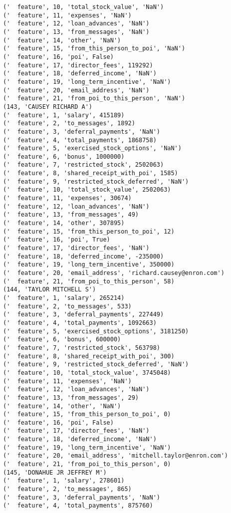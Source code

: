 \begin{verbatim}
('  feature', 10, 'total_stock_value', 'NaN')
('  feature', 11, 'expenses', 'NaN')
('  feature', 12, 'loan_advances', 'NaN')
('  feature', 13, 'from_messages', 'NaN')
('  feature', 14, 'other', 'NaN')
('  feature', 15, 'from_this_person_to_poi', 'NaN')
('  feature', 16, 'poi', False)
('  feature', 17, 'director_fees', 119292)
('  feature', 18, 'deferred_income', 'NaN')
('  feature', 19, 'long_term_incentive', 'NaN')
('  feature', 20, 'email_address', 'NaN')
('  feature', 21, 'from_poi_to_this_person', 'NaN')
(143, 'CAUSEY RICHARD A')
('  feature', 1, 'salary', 415189)
('  feature', 2, 'to_messages', 1892)
('  feature', 3, 'deferral_payments', 'NaN')
('  feature', 4, 'total_payments', 1868758)
('  feature', 5, 'exercised_stock_options', 'NaN')
('  feature', 6, 'bonus', 1000000)
('  feature', 7, 'restricted_stock', 2502063)
('  feature', 8, 'shared_receipt_with_poi', 1585)
('  feature', 9, 'restricted_stock_deferred', 'NaN')
('  feature', 10, 'total_stock_value', 2502063)
('  feature', 11, 'expenses', 30674)
('  feature', 12, 'loan_advances', 'NaN')
('  feature', 13, 'from_messages', 49)
('  feature', 14, 'other', 307895)
('  feature', 15, 'from_this_person_to_poi', 12)
('  feature', 16, 'poi', True)
('  feature', 17, 'director_fees', 'NaN')
('  feature', 18, 'deferred_income', -235000)
('  feature', 19, 'long_term_incentive', 350000)
('  feature', 20, 'email_address', 'richard.causey@enron.com')
('  feature', 21, 'from_poi_to_this_person', 58)
(144, 'TAYLOR MITCHELL S')
('  feature', 1, 'salary', 265214)
('  feature', 2, 'to_messages', 533)
('  feature', 3, 'deferral_payments', 227449)
('  feature', 4, 'total_payments', 1092663)
('  feature', 5, 'exercised_stock_options', 3181250)
('  feature', 6, 'bonus', 600000)
('  feature', 7, 'restricted_stock', 563798)
('  feature', 8, 'shared_receipt_with_poi', 300)
('  feature', 9, 'restricted_stock_deferred', 'NaN')
('  feature', 10, 'total_stock_value', 3745048)
('  feature', 11, 'expenses', 'NaN')
('  feature', 12, 'loan_advances', 'NaN')
('  feature', 13, 'from_messages', 29)
('  feature', 14, 'other', 'NaN')
('  feature', 15, 'from_this_person_to_poi', 0)
('  feature', 16, 'poi', False)
('  feature', 17, 'director_fees', 'NaN')
('  feature', 18, 'deferred_income', 'NaN')
('  feature', 19, 'long_term_incentive', 'NaN')
('  feature', 20, 'email_address', 'mitchell.taylor@enron.com')
('  feature', 21, 'from_poi_to_this_person', 0)
(145, 'DONAHUE JR JEFFREY M')
('  feature', 1, 'salary', 278601)
('  feature', 2, 'to_messages', 865)
('  feature', 3, 'deferral_payments', 'NaN')
('  feature', 4, 'total_payments', 875760)

\end{verbatim}

